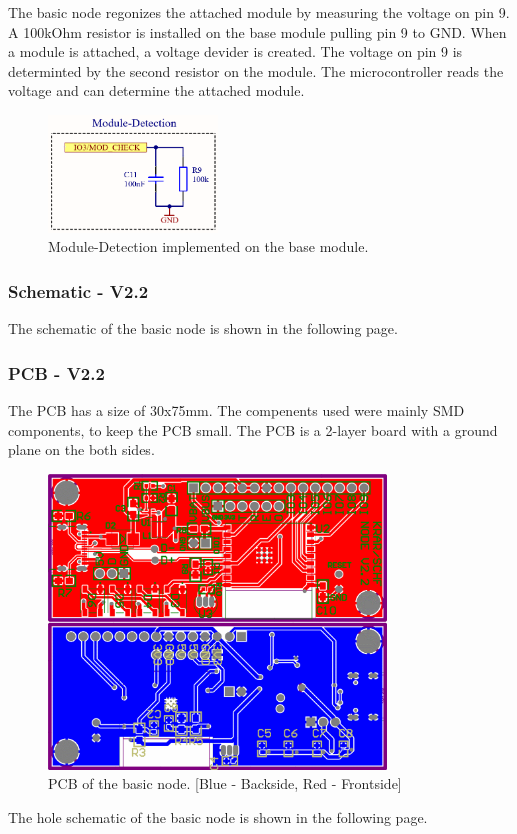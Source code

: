         The basic node regonizes the attached module by measuring the voltage on pin 9.
        A 100kOhm resistor is installed on the base module pulling pin 9 to GND. 
        When a module is attached, a voltage devider is created. The voltage on pin 9 is 
        determinted by the second resistor on the module. The microcontroller reads the
        voltage and can determine the attached module. 
    
    \begin{figure}[H]
        \centering
        \includegraphics[width=0.4\textwidth]{assets/HW/Node-Module-Check.png}
        \caption{Module-Detection implemented on the base module.}
    \end{figure}
    
    
    
    \subsubsection{Schematic - V2.2}
        The schematic of the basic node is shown in the following page.
    
    

    \subsubsection{PCB - V2.2}

        The PCB has a size of 30x75mm. The compenents used were mainly SMD components, 
        to keep the PCB small. The PCB is a 2-layer board with a ground plane on the
        both sides.

    \begin{figure}[H]
        \centering
        \includegraphics[width=0.8\textwidth]{assets/HW/PCB-NODE-V2.2.png}
        \caption{PCB of the basic node. [Blue - Backside, Red - Frontside]}
    \end{figure}	

    


        The hole schematic of the basic node is shown in the following page.
    
 
